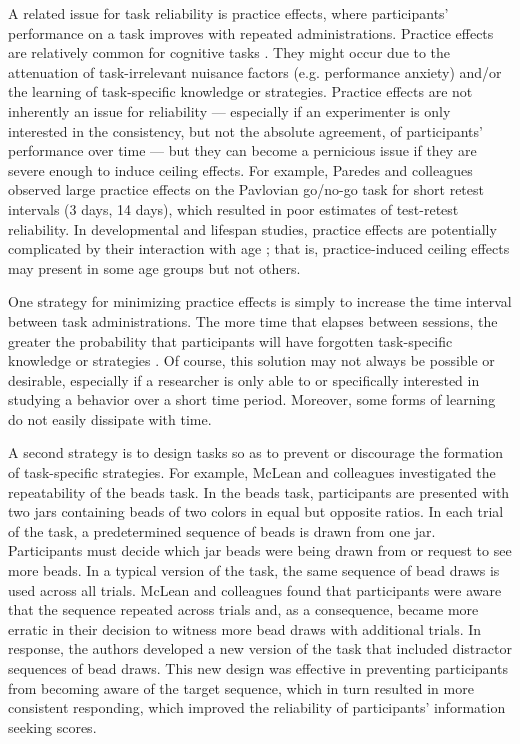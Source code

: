 \documentclass[a4paper,12pt]{article}
\begin{document}
A related issue for task reliability is practice effects, where participants' performance on a task improves with repeated administrations. Practice effects are relatively common for cognitive tasks \cite{hausknecht2007retesting, scharfen2018retest}. They might occur due to the attenuation of task-irrelevant nuisance factors (e.g. performance anxiety) and/or the learning of task-specific knowledge or strategies. Practice effects are not inherently an issue for reliability --- especially if an experimenter is only interested in the consistency, but not the absolute agreement, of participants' performance over time --- but they can become a pernicious issue if they are severe enough to induce ceiling effects. For example, Paredes and colleagues \cite{paredes2021psychometric} observed large practice effects on the Pavlovian go/no-go task for short retest intervals (3 days, 14 days), which resulted in poor estimates of test-retest reliability. In developmental and lifespan studies, practice effects are potentially complicated by their interaction with age \cite{anokhin2022age, salthouse2010influence}; that is, practice-induced ceiling effects may present in some age groups but not others. 

One strategy for minimizing practice effects is simply to increase the time interval between task administrations. The more time that elapses between sessions, the greater the probability that participants will have forgotten task-specific knowledge or strategies \cite{hausknecht2007retesting, scharfen2018retest}. Of course, this solution may not always be possible or desirable, especially if a researcher is only able to or specifically interested in studying a behavior over a short time period. Moreover, some forms of learning do not easily dissipate with time.

A second strategy is to design tasks so as to prevent or discourage the formation of task-specific strategies. For example, McLean and colleagues \cite{mclean2018towards} investigated the repeatability of the beads task. In the beads task, participants are presented with two jars containing beads of two colors in equal but opposite ratios. In each trial of the task, a predetermined sequence of beads is drawn from one jar. Participants must decide which jar beads were being drawn from or request to see more beads. In a typical version of the task, the same sequence of bead draws is used across all trials. McLean and colleagues found that participants were aware that the sequence repeated across trials and, as a consequence, became more erratic in their decision to witness more bead draws with additional trials. In response, the authors developed a new version of the task that included distractor sequences of bead draws. This new design was effective in preventing participants from becoming aware of the target sequence, which in turn resulted in more consistent responding, which improved the reliability of participants' information seeking scores. 
\end{document}
